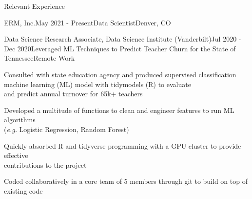 \documentclass{resume} %
\newcommand{\commentblock}[1]{}
\begin{document}
\begin{rSection}{Relevant Experience}
\begin{rSubsection}{ERM, Inc.}{May 2021 - Present}{Data Scientist}{Denver, CO}
\commentblock{
    \item {Constructed Custom GIS Tool to Quantify Forest Quality Around the Globe: Used python and ArcGIS to create ArcPro toolbox}
        \vspace{-0.5em}
        \subitem{$\cdot$ Utilized the pythonic arcpy module to generate a custom tool that allows the user to acquire forest quality around the globe}
        \vspace{-0.5em}
        \subitem {$\cdot$ Leveraged pythonic methods to create tool with simple interface for user and readable reports}
        \vspace{0.25em}
    \item {Selected to lead the changes for advanced computational infrastructure for N. American \\ Data Science teams}
}
\end{rSubsection} 


\begin{rSubsection}{Data Science Research Associate, Data Science Institute (Vanderbilt)}{Jul 2020 - Dec 2020}{Leveraged ML Techniques to Predict Teacher Churn for the State of Tennessee}{Remote Work} 
\item {Consulted with state education agency and produced supervised classification machine learning (ML) model with tidymodels (R) to evaluate \\ and predict annual turnover for 65k+ teachers }
\item {Developed a multitude of functions to clean and engineer features to run ML algorithms \\ (\emph{e.g.} Logistic Regression, Random Forest)}
\item {Quickly absorbed R and tidyverse programming with a GPU cluster to provide effective \\ contributions to the project}
\item {Coded collaboratively in a core team of 5 members through git to build on top of existing code}

\end{rSubsection} 


\end{rSection}
\end{document}
